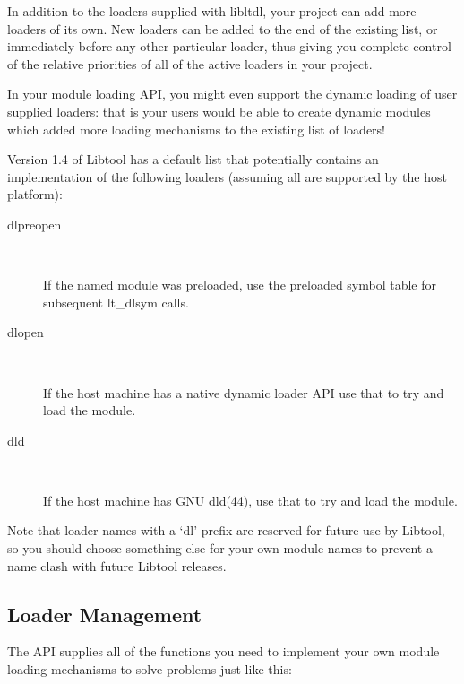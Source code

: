 In addition to the loaders supplied with libltdl, your project can add more loaders of its own. New loaders can be added to the end of the existing list, or immediately before any other particular loader, thus giving you complete control of the relative priorities of all of the active loaders in your project.

In your module loading API, you might even support the dynamic loading of user supplied loaders: that is your users would be able to create dynamic modules which added more loading mechanisms to the existing list of loaders!

Version 1.4 of Libtool has a default list that potentially contains an implementation of the following loaders (assuming all are supported by the host platform): 


\begin{description}
\item[dlpreopen]
\

    If the named module was preloaded, use the preloaded symbol table for subsequent lt\_{}dlsym calls.

\item[dlopen]
\

    If the host machine has a native dynamic loader API use that to try and load the module.

\item[dld]
\

    If the host machine has GNU dld(44), use that to try and load the module.
\end{description}

Note that loader names with a `dl' prefix are reserved for future use by Libtool, so you should choose something else for your own module names to prevent a name clash with future Libtool releases.

\subsection{Loader Management}

The API supplies all of the functions you need to implement your own module loading mechanisms to solve problems just like this:

